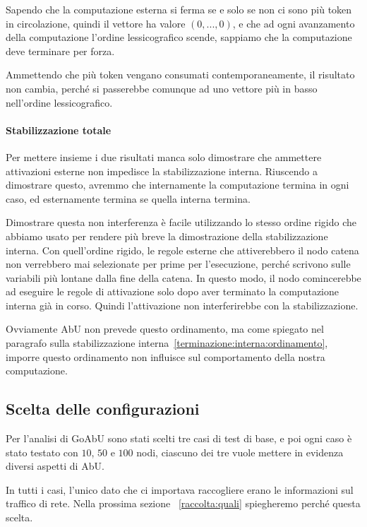 \documentclass[12pt, a4paper]{article}
\begin{document}
Sapendo che la computazione esterna si ferma se e solo se non ci sono più token in circolazione, quindi il vettore ha valore $(0,...,0)$, e che ad ogni avanzamento della computazione l'ordine lessicografico scende, sappiamo che la computazione deve terminare per forza.

Ammettendo che più token vengano consumati contemporaneamente, il risultato non cambia, perché si passerebbe comunque ad uno vettore più in basso nell'ordine lessicografico.

\paragraph{Stabilizzazione totale}\label{terminazione:totale}

Per mettere insieme i due risultati manca solo dimostrare che ammettere attivazioni esterne non impedisce la stabilizzazione interna. Riuscendo a dimostrare questo, avremmo che internamente la computazione termina in ogni caso, ed esternamente termina se quella interna termina.

Dimostrare questa non interferenza è facile utilizzando lo stesso ordine rigido che abbiamo usato per rendere più breve la dimostrazione della stabilizzazione interna. Con quell'ordine rigido, le regole esterne che attiverebbero il nodo catena non verrebbero mai selezionate per prime per l'esecuzione, perché scrivono sulle variabili più lontane dalla fine della catena.
In questo modo, il nodo comincerebbe ad eseguire le regole di attivazione solo dopo aver terminato la computazione interna già in corso. Quindi l'attivazione non interferirebbe con la stabilizzazione.

Ovviamente AbU non prevede questo ordinamento, ma come spiegato nel paragrafo sulla stabilizzazione interna~\ref{terminazione:interna:ordinamento}, imporre questo ordinamento non influisce sul comportamento della nostra computazione.

\subsection{Scelta delle configurazioni}

Per l'analisi di GoAbU sono stati scelti tre casi di test di base, e poi ogni caso è stato testato con $10$, $50$ e $100$ nodi, ciascuno dei tre vuole mettere in evidenza diversi aspetti di AbU.

In tutti i casi, l'unico dato che ci importava raccogliere erano le informazioni sul traffico di rete. Nella prossima sezione ~\ref{raccolta:quali} spiegheremo perché questa scelta.
\end{document}
